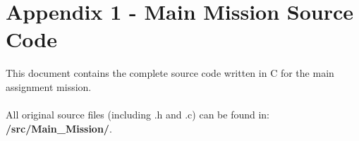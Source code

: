 \documentclass{article}
\begin{document}
\section*{Appendix 1 - Main Mission Source Code}

This document contains the complete source code written in C for the main assignment mission.\\\\
All original source files (including .h and .c) can be found in: \textbf{/src/Main\_Mission/}.
\end{document}
